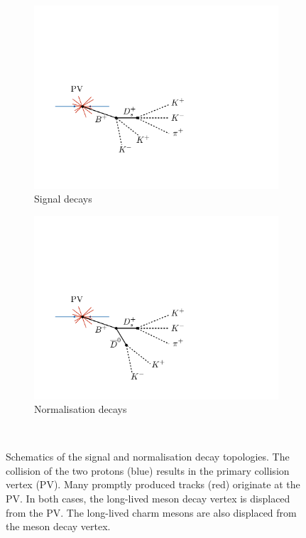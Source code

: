 \begin{figure}[!h]
    \centering
    \begin{subfigure}[t]{0.4\textwidth}
        \includegraphics[width=1.0\textwidth]{figs/Selection/B2DsKK_topology.pdf}
        \caption{Signal decays}
    \end{subfigure}%
    \begin{subfigure}[t]{0.4\textwidth}
        \includegraphics[width=1.0\textwidth]{figs/Selection/B2DsD0_topology.pdf}
        \caption{Normalisation decays}
    \end{subfigure}\\
    \caption{Schematics of the signal and normalisation decay topologies. The collision of the two protons (blue) results in the primary collision vertex (PV). Many promptly produced tracks (red) originate at the PV. In both cases, the long-lived \Bp meson decay vertex is displaced from the PV. The long-lived charm mesons are also displaced from the \Bp meson decay vertex.}
    \label{fig:topo}   
\end{figure}

